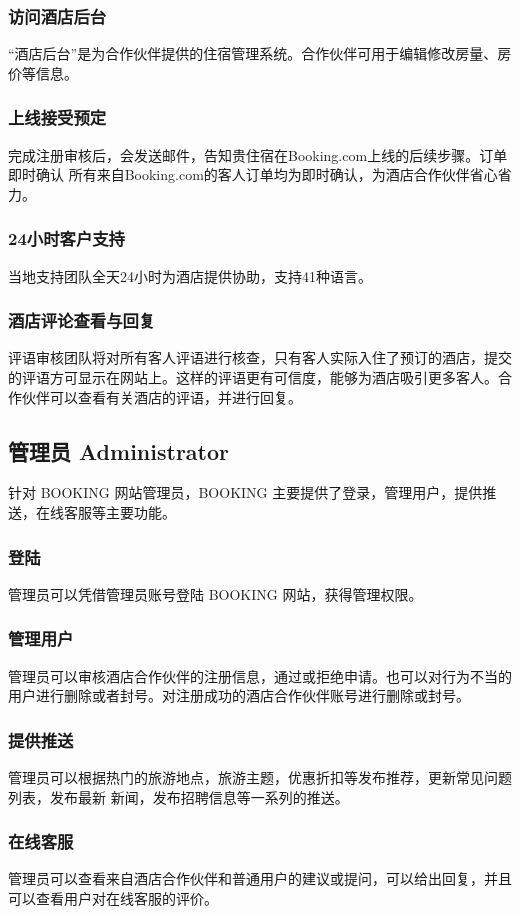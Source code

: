 \documentclass[11pt]{article}
\begin{document}
		\subsubsection{访问酒店后台}
		“酒店后台”是为合作伙伴提供的住宿管理系统。合作伙伴可用于编辑修改房量、房价等信息。
		\subsubsection{上线接受预定}
		完成注册审核后，会发送邮件，告知贵住宿在Booking.com上线的后续步骤。订单即时确认
        	所有来自Booking.com的客人订单均为即时确认，为酒店合作伙伴省心省力。
        	\subsubsection{24小时客户支持}
        	当地支持团队全天24小时为酒店提供协助，支持41种语言。
        	\subsubsection{酒店评论查看与回复}
        	评语审核团队将对所有客人评语进行核查，只有客人实际入住了预订的酒店，提交的评语方可显示在网站上。这样的评语更有可信度，能够为酒店吸引更多客人。合作伙伴可以查看有关酒店的评语，并进行回复。
	\subsection{管理员 Administrator}
        针对 BOOKING 网站管理员，BOOKING 主要提供了登录，管理用户，提供推送，在线客服等主要功能。 
        	\subsubsection{登陆}
        	管理员可以凭借管理员账号登陆 BOOKING 网站，获得管理权限。 
        	\subsubsection{管理用户}  
        	管理员可以审核酒店合作伙伴的注册信息，通过或拒绝申请。也可以对行为不当的用户进行删除或者封号。对注册成功的酒店合作伙伴账号进行删除或封号。 
        	\subsubsection{提供推送}
        	管理员可以根据热门的旅游地点，旅游主题，优惠折扣等发布推荐，更新常见问题列表，发布最新 新闻，发布招聘信息等一系列的推送。 
        	\subsubsection{在线客服}  
        	管理员可以查看来自酒店合作伙伴和普通用户的建议或提问，可以给出回复，并且可以查看用户对在线客服的评价。
\end{document}
